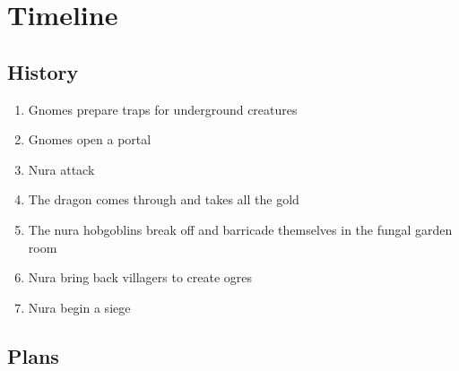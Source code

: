 \chapter{Timeline}

\section{History}

\begin{multicols}{2}

\begin{enumerate}

	\item{Gnomes prepare traps for underground creatures}
	\item{Gnomes open a portal}
	\item{Nura attack}
	\item{The dragon comes through and takes all the gold}
	\item{The nura hobgoblins break off and barricade themselves in the fungal garden room}
	\item{Nura bring back villagers to create ogres}
	\item{Nura begin a siege}

\end{enumerate}

\end{multicols}

\section{Plans}

